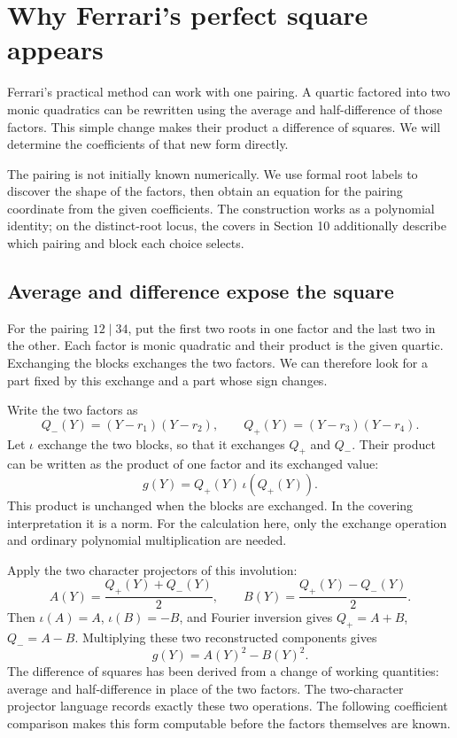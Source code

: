 \documentclass[11pt]{article}
\theoremstyle{remark}
\begin{document}
\section{Why Ferrari's perfect square appears}

Ferrari's practical method can work with one pairing. A quartic factored into two monic quadratics can be rewritten using the average and half-difference of those factors. This simple change makes their product a difference of squares. We will determine the coefficients of that new form directly.

The pairing is not initially known numerically. We use formal root labels to discover the shape of the factors, then obtain an equation for the pairing coordinate from the given coefficients. The construction works as a polynomial identity; on the distinct-root locus, the covers in Section 10 additionally describe which pairing and block each choice selects.

\subsection{Average and difference expose the square}

For the pairing \(12\mid34\), put the first two roots in one factor and the last two in the other. Each factor is monic quadratic and their product is the given quartic. Exchanging the blocks exchanges the two factors. We can therefore look for a part fixed by this exchange and a part whose sign changes.

Write the two factors as
\[
Q_-(Y)=(Y-r_1)(Y-r_2),\qquad
Q_+(Y)=(Y-r_3)(Y-r_4).
\]
Let \(\iota\) exchange the two blocks, so that it exchanges \(Q_+\) and \(Q_-\). Their product can be written as the product of one factor and its exchanged value:
\[
g(Y)=Q_+(Y)\,\iota(Q_+(Y)).
\]
This product is unchanged when the blocks are exchanged. In the covering interpretation it is a norm. For the calculation here, only the exchange operation and ordinary polynomial multiplication are needed.

Apply the two character projectors of this involution:
\[
A(Y)=\frac{Q_+(Y)+Q_-(Y)}{2},\qquad
B(Y)=\frac{Q_+(Y)-Q_-(Y)}{2}.
\]
Then \(\iota(A)=A\), \(\iota(B)=-B\), and Fourier inversion gives \(Q_+=A+B\), \(Q_-=A-B\). Multiplying these two reconstructed components gives
\begin{equation}
g(Y)=A(Y)^2-B(Y)^2.
\label{eq:quartic-block-norm}
\end{equation}
The difference of squares has been derived from a change of working quantities: average and half-difference in place of the two factors. The two-character projector language records exactly these two operations. The following coefficient comparison makes this form computable before the factors themselves are known.
\end{document}
